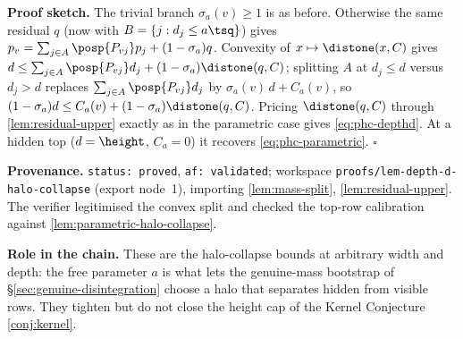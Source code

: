 \noindent\textbf{Proof sketch.} The trivial branch $\sigma_a(v)\ge1$ is as before. Otherwise the same
residual $q$ (now with $B=\{j:d_j\le a\tsq\}$) gives $p_v=\sum_{j\in A}\posp{P_{vj}}p_j+(1-\sigma_a)q$.
Convexity of $x\mapsto\distone(x,C)$ gives $d\le\sum_{j\in A}\posp{P_{vj}}d_j+(1-\sigma_a)\distone(q,C)$;
splitting $A$ at $d_j\le d$ versus $d_j>d$ replaces $\sum_{j\in A}\posp{P_{vj}}d_j$ by
$\sigma_a(v)\,d+C_a(v)$, so $(1-\sigma_a)d\le C_a(v)+(1-\sigma_a)\distone(q,C)$. Pricing $\distone(q,C)$
through \ref{lem:residual-upper} exactly as in the parametric case gives \eqref{eq:phc-depthd}. At a
hidden top ($d=\height$, $C_a=0$) it recovers \eqref{eq:phc-parametric}. \hfill$\square$

\noindent\textbf{Provenance.} \texttt{status: proved}, \texttt{af: validated}; workspace
\texttt{proofs/lem-depth-d-halo-collapse} (export node~1), importing \ref{lem:mass-split},
\ref{lem:residual-upper}. The verifier legitimised the convex split and checked the top-row
calibration against \ref{lem:parametric-halo-collapse}.

\noindent\textbf{Role in the chain.} These are the halo-collapse bounds at arbitrary width and depth:
the free parameter $a$ is what lets the genuine-mass bootstrap of \S\ref{sec:genuine-disintegration}
choose a halo that separates hidden from visible rows. They tighten but do not close the height cap of
the Kernel Conjecture \ref{conj:kernel}.
